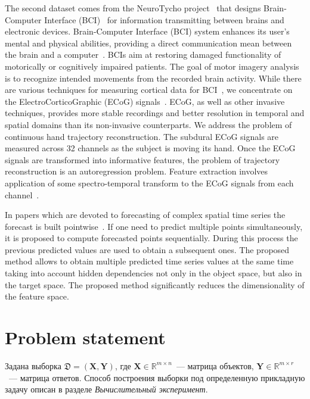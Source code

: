 \documentclass[12pt,twoside]{article}
\newcommand{\bY}{\mathbf{Y}}
\newcommand{\bX}{\mathbf{X}}
\begin{document}
The second dataset comes from the NeuroTycho project~\cite{neurotycho} that designs Brain-Computer Interface (BCI)~\cite{millan2010combining,mason2007comprehensive} for information transmitting between brains and electronic devices.
Brain-Computer Interface (BCI) system enhances its user’s mental and physical abilities, providing a direct communication mean between the brain and a computer~\cite{millan2004brain}. 
BCIs aim at restoring damaged functionality of motorically or cognitively impaired patients.
The goal of motor imagery analysis is to recognize intended movements from the recorded brain activity. 
While there are various techniques for measuring cortical data for BCI~\cite{nicolas2012brain,amiri2013review}, we concentrate on the ElectroCorticoGraphic (ECoG) signals~\cite{eliseyev2016penalized}. 
ECoG, as well as other invasive techniques, provides more stable recordings and better resolution in temporal and spatial domains than its non-invasive counterparts.
We address the problem of continuous hand trajectory reconstruction. 
The subdural ECoG signals are measured across 32 channels as the subject is moving its hand.
Once the ECoG signals are transformed into informative features, the problem of trajectory reconstruction is an autoregression problem. 
Feature extraction involves application of some spectro-temporal transform to the ECoG signals from each channel~\cite{gasanov2017pls}.

In papers which are devoted to forecasting of complex spatial time series the forecast is built pointwise~\cite{box2015time,zhang2003time}.
If one need to predict multiple points simultaneously, it is proposed to compute forecasted points sequentially.
During this process the previous predicted values are used to obtain a subsequent ones.
The proposed method allows to obtain multiple predicted time series values at the same time taking into account hidden dependencies not only in the object space, but also in the target space.
The proposed method significantly reduces the dimensionality of the feature space.
 

\section{Problem statement}
Задана выборка $\mathfrak{D}= \left( \bX, \bY \right)$, где $\mathbf{X} \in \mathbb{R}^{m \times n}$~--- матрица объектов, $\mathbf{Y} \in \mathbb{R}^{m \times r}$~--- матрица ответов. 
Способ построения выборки под определенную прикладную задачу описан в разделе \textit{Вычислительный эксперимент}.
\end{document}
